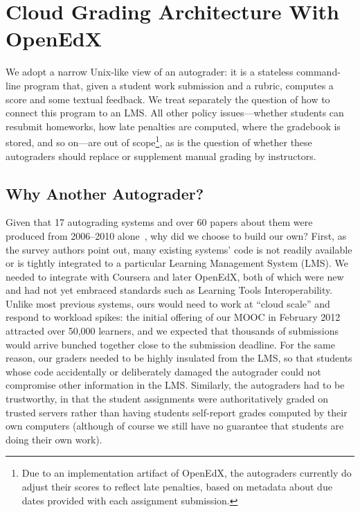\section{Cloud Grading Architecture With OpenEdX}
\label{sec:arch}

We adopt a narrow Unix-like view of an autograder: it is a
stateless command-line program that, given a student work submission and
a rubric, computes a score and some textual feedback.  We treat
separately the question of how to connect this program to an LMS.
All other policy issues---whether students can resubmit homeworks, how
late penalties are computed, where the gradebook is stored, and so 
on---are out of scope\footnote{Due to an implementation
  artifact of OpenEdX, the autograders currently do adjust their scores
  to reflect late penalties, based on metadata about due dates provided
  with each assignment submission.}, as is the question of whether these
autograders should replace or supplement manual grading by instructors.

\subsection{Why Another Autograder?}

Given that 17 autograding systems and over 60 papers about them were
produced from 2006--2010 alone~\cite{ihantola-2010-autograding-survey},
why did we choose to build our own?
First, as the survey authors point
out, many existing systems' code
is not readily available or is tightly integrated to a particular Learning
Management System (LMS).  We needed to integrate with Coursera and
later OpenEdX, both of which were new and had not yet embraced
standards such as Learning Tools Interoperability.
Unlike most previous 
systems, ours would need to work at ``cloud scale'' and respond to
workload spikes: the initial
offering of our MOOC in February 2012  
attracted over 50,000 learners, and we expected
that thousands of submissions would arrive bunched together close to the
submission deadline.  For the same reason, our graders needed to be
highly insulated from the LMS, so that students whose code accidentally
or deliberately damaged the autograder could not compromise other
information in the LMS.
Similarly, 
the autograders had to be trustworthy, in that the student
assignments were authoritatively graded on trusted servers rather than
having students self-report grades computed by their own computers
(although of course we still have no guarantee that students are doing
their own work).


